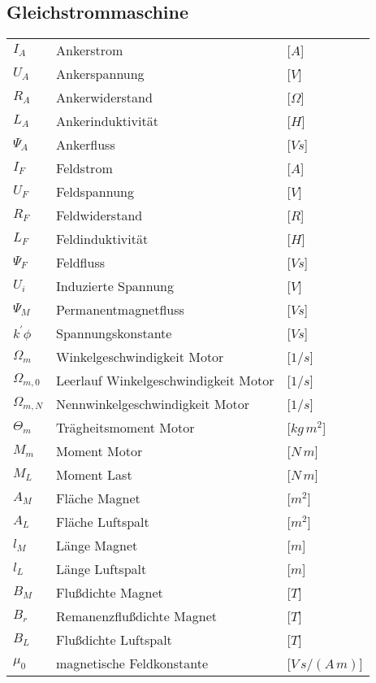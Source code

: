 \documentclass[12pt]{article} %
\numberwithin{equation}{subsection}
\begin{document}
	\subsection{Gleichstrommaschine} %
	\begin{tabular}{L{2cm}lR{2cm}}
		$I_A$  &Ankerstrom  &[$A$]\\
		$U_A$ &Ankerspannung & [$V$]\\
		$R_A$  &Ankerwiderstand &[$ \Omega $] \\
		$L_A$  &Ankerinduktivität &[$H$]\\
		$\Psi_A$ &Ankerfluss & [$Vs$]\\
		$I_F$ & Feldstrom & [$A$]\\
		$U_F$ & Feldspannung & [$V$]\\
		$R_F$ & Feldwiderstand & [$R$]\\
		$L_F$ & Feldinduktivität & [$H$]\\
		$\Psi_F$ &Feldfluss & [$Vs$]\\
		$U_i$ &Induzierte Spannung & [$V$]\\
		$\Psi_M$ &Permanentmagnetfluss & [$Vs$]\\
		$k^{'} \phi$ &Spannungskonstante & [$Vs$]\\
		$\Omega_m$ &Winkelgeschwindigkeit Motor & [$1/s$]\\
		$\Omega_{m,0}$ &Leerlauf Winkelgeschwindigkeit Motor & [$1/s$]\\
		$\Omega_{m,N}$ &Nennwinkelgeschwindigkeit Motor & [$1/s$]\\
		$\Theta_m$ &Trägheitsmoment Motor & [$kg \, m^{2}$]\\
		$M_m$ &Moment Motor & [$N\,m$]\\
		$M_L$ &Moment Last & [$N\,m$]\\
		$A_M$ &Fläche Magnet & [$m^{2}$]\\
		$A_L$ &Fläche Luftspalt & [$m^{2}$]\\
		$l_M$ &Länge Magnet & [$m$]\\
		$l_L$ &Länge Luftspalt & [$m$]\\
		$B_M$ &Flußdichte Magnet & [$T$]\\
		$B_r$ &Remanenzflußdichte Magnet & [$T$]\\
		$B_L$ &Flußdichte Luftspalt & [$T$]\\
		$\mu_0$ &magnetische Feldkonstante & [$V\,s/ (A \, m)$]\\
	\end{tabular}\\
\end{document}
